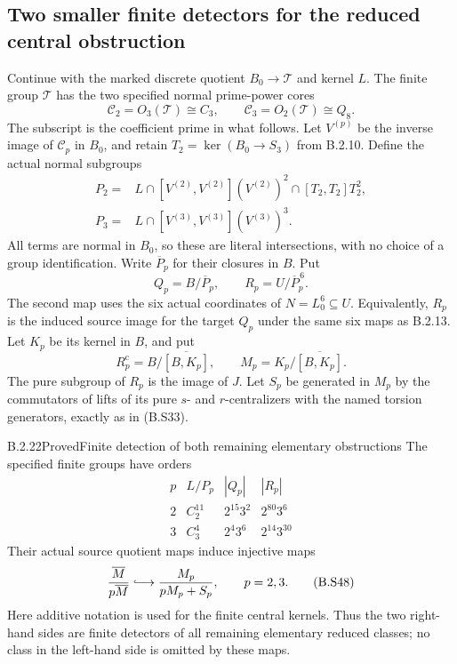 \subsection{Two smaller finite detectors for the reduced central obstruction}

Continue with the marked discrete quotient
$B_0\to\mathcal T$ and kernel $L$.
The finite group $\mathcal T$ has the two specified
normal prime-power cores
\[
 \mathcal C_2=O_3(\mathcal T)\cong C_3,
       \qquad \mathcal C_3=O_2(\mathcal T)\cong Q_8.                    \tag{B.S44}
\]
The subscript is the coefficient prime in what follows.
Let $V^{(p)}$ be the inverse image of $\mathcal C_p$ in $B_0$,
and retain $T_2=\ker(B_0\to S_3)$ from B.2.10.
Define the actual normal subgroups
\[
\begin{aligned}
 P_2={}&L\cap[V^{(2)},V^{(2)}](V^{(2)})^2
              \cap[T_2,T_2]T_2^2,\\
 P_3={}&L\cap[V^{(3)},V^{(3)}](V^{(3)})^3.
\end{aligned}                                                   \tag{B.S45}
\]
All terms are normal in $B_0$, so these are literal
intersections, with no choice of a group identification.
Write $\overline P_p$ for their closures in $B$.
Put
\[
 Q_p=B/\overline P_p,
       \qquad R_p=U/\overline P_p^{\,6}.                       \tag{B.S46}
\]
The second map uses the six actual coordinates of
$N=L_0^6\subseteq U$.  Equivalently, $R_p$ is the
induced source image for the target $Q_p$ under the
same six maps as B.2.13.  Let $K_p$ be its kernel
in $B$, and put
\[
 R_p^{\mathrm c}=B/\overline{[B,K_p]},\qquad
 M_p=K_p/\overline{[B,K_p]}.
\]
The pure subgroup of $R_p$ is the image of $J$.
Let $S_p$ be generated in $M_p$ by the commutators
of lifts of its pure $s$- and $r$-centralizers with
the named torsion generators, exactly as in (B.S33).

\begin{result}{B.2.22}{Proved}{Finite detection of both remaining elementary obstructions}
The specified finite groups have orders
\[
\begin{array}{c|c|c|c}
 p&L/P_p&|Q_p|&|R_p|\\ \hline
 2&C_2^{11}&2^{15}3^2&2^{80}3^6\\
 3&C_3^4&2^4 3^6&2^{14}3^{30}
\end{array}                                                     \tag{B.S47}
\]
Their actual source quotient maps induce injective maps
\[
 \frac{\overline M}{p\overline M}
       \lhook\joinrel\longrightarrow
                 \frac{M_p}{pM_p+S_p},
                         \qquad p=2,3.                        \tag{B.S48}
\]
Here additive notation is used for the finite central
kernels.  Thus the two right-hand sides are finite
detectors of all remaining elementary reduced classes;
no class in the left-hand side is omitted by these maps.
\end{result}

